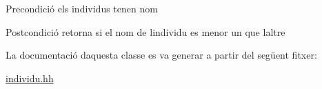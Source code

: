 \begin{DoxyPrecond}{Precondició}
els individus tenen nom 
\end{DoxyPrecond}
\begin{DoxyPostcond}{Postcondició}
retorna si el nom de l\textquotesingle{}individu es menor un que l\textquotesingle{}altre 
\end{DoxyPostcond}


La documentació d\textquotesingle{}aquesta classe es va generar a partir del següent fitxer\+:\begin{DoxyCompactItemize}
\item 
\hyperlink{individu_8hh}{individu.\+hh}\end{DoxyCompactItemize}
